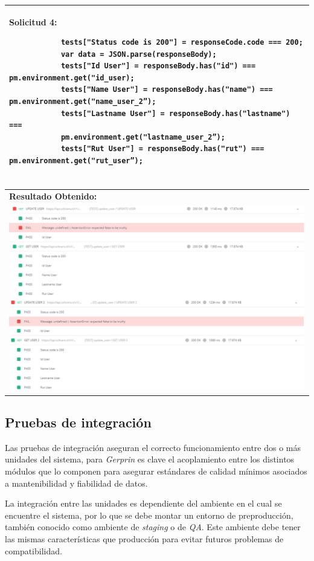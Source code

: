 \begin{table}[H]
    \begin{tabular}{|p{}|}
    	\hline
		Solicitud 4:
		\begin{verbatim}
			tests["Status code is 200"] = responseCode.code === 200;
			var data = JSON.parse(responseBody);
			tests["Id User"] = responseBody.has("id") === pm.environment.get("id_user);
			tests["Name User"] = responseBody.has("name") === pm.environment.get("name_user_2”);
			tests["Lastname User"] = responseBody.has("lastname") === 
			pm.environment.get("lastname_user_2”);
			tests["Rut User"] = responseBody.has("rut") === pm.environment.get("rut_user”);
 
		\end{verbatim}  
		
		\\ \hline
		\textbf{Resultado Obtenido:}\\
		\includegraphics[width=15cm]{figures/Respuestapruebasunitarias.png}
		\\ \hline
    \end{tabular}
\end{table}

\subsection{Pruebas de integración}

Las pruebas de integración aseguran el correcto funcionamiento entre dos o más unidades del sistema, para \textit{Gerprin} es clave el acoplamiento entre los distintos módulos que lo componen para asegurar estándares de calidad mínimos asociados a mantenibilidad y fiabilidad de datos.

La integración entre las unidades es dependiente del ambiente en el cual se encuentre el sistema, por lo que se debe montar un entorno de preproducción, también conocido como ambiente de \textit{staging} o de \textit{QA}. Este ambiente debe tener las mismas características que producción para evitar futuros problemas de compatibilidad.

